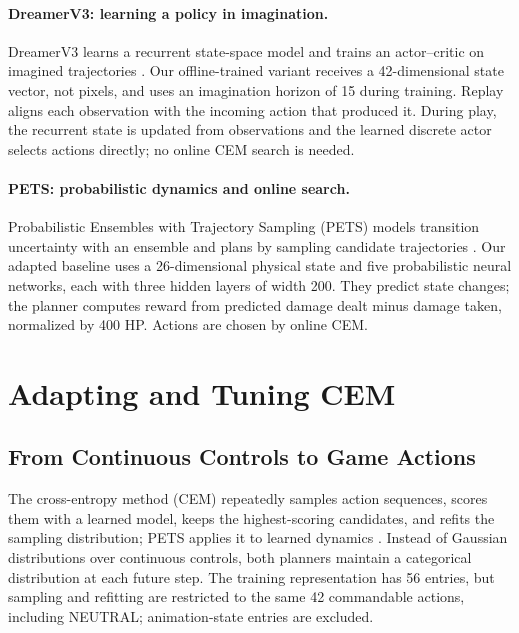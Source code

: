 \documentclass[10pt,twocolumn]{article}
\newcommand{\dreamer}{DreamerV3}
\newcommand{\pets}{PETS}
\begin{document}
\paragraph{\dreamer{}: learning a policy in imagination.}
\dreamer{} learns a recurrent state-space model and trains an actor--critic
on imagined trajectories
\cite{hafner2020dreamer,hafner2023dreamerv3,hafner2025dreamerv3nature}.
Our offline-trained variant receives a 42-dimensional state vector, not
pixels, and uses an imagination horizon of 15 during training.
Replay aligns each observation with the
incoming action that produced it.  During play, the recurrent state is
updated from observations and the learned discrete actor selects actions
directly; no online CEM search is needed.

\paragraph{\pets{}: probabilistic dynamics and online search.}
Probabilistic Ensembles with Trajectory Sampling (\pets{}) models
transition uncertainty with an ensemble and plans by
sampling candidate trajectories \cite{chua2018pets}.  Our adapted baseline
uses a 26-dimensional physical state and five probabilistic neural networks,
each with three hidden layers of width 200.  They predict state changes;
the planner computes reward from predicted damage dealt minus damage
taken, normalized by 400 HP.  Actions are chosen by online CEM.

\section{Adapting and Tuning CEM}

\subsection{From Continuous Controls to Game Actions}

The cross-entropy method (CEM) \cite{rubinstein1999cem,deboer2005cem}
repeatedly samples action sequences, scores them with a learned model,
keeps the highest-scoring candidates, and refits the sampling distribution;
\pets{} applies it to learned dynamics \cite{chua2018pets}.
Instead of Gaussian distributions over continuous
controls, both planners maintain a categorical distribution at each future
step.  The training representation has 56 entries, but sampling and refitting
are restricted to the same 42 commandable actions, including NEUTRAL;
animation-state entries are excluded.
\end{document}
